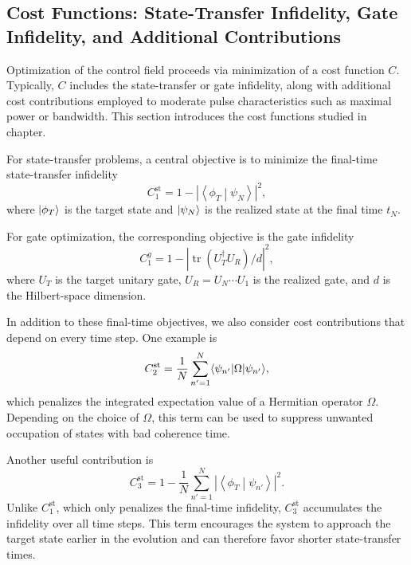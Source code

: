 \subsection{Cost Functions: State-Transfer Infidelity, Gate Infidelity, and Additional Contributions}
\label{subsec: cost functions}
Optimization of the control field proceeds via minimization of a cost function $C$. Typically, $C$ includes the state-transfer or gate infidelity, along with additional cost contributions employed to moderate pulse characteristics such as maximal power or bandwidth. This section introduces the cost functions studied in chapter.

For state-transfer problems, a central objective is to minimize the final-time state-transfer infidelity
\begin{equation}
\label{C1st}
C_1^{\mathrm{st}}
=
1-\left|\left\langle \phi_T \middle| \psi_N \right\rangle\right|^2,
\end{equation}
where $|\phi_T\rangle$ is the target state and $|\psi_N\rangle$ is the realized state at the final time $t_N$.

For gate optimization, the corresponding objective is the gate infidelity
\begin{equation}
C_1^{g}
=
1-\left|\operatorname{tr}\!\left(U_T^\dagger U_R\right)/d\right|^2,
\end{equation}
where $U_T$ is the target unitary gate, $U_R=U_N\cdots U_1$ is the realized gate, and $d$ is the Hilbert-space dimension.

In addition to these final-time objectives, we also consider cost contributions that depend on every time step. One example is
\begin{equation}
\label{c2st}
C_2^{\mathrm{st}}
=
\frac{1}{N}\sum_{n'=1}^N \langle\psi_{n'}|\Omega |\psi_{n'}\rangle,
\end{equation}
which penalizes the integrated expectation value of a Hermitian operator $\Omega$. Depending on the choice of $\Omega$, this term can be used to suppress unwanted  occupation of states with bad coherence time.

Another useful contribution is
\begin{equation}
C_3^{\mathrm{st}}
=
1-\frac{1}{N}\sum_{n'=1}^N
\left|
\left\langle \phi_T \middle| \psi_{n'} \right\rangle
\right|^2.
\end{equation}
Unlike $C_1^{\mathrm{st}}$, which only penalizes the final-time infidelity, $C_3^{\mathrm{st}}$ accumulates the infidelity over all time steps. This term encourages the system to approach the target state earlier in the evolution and can therefore favor shorter state-transfer times.

